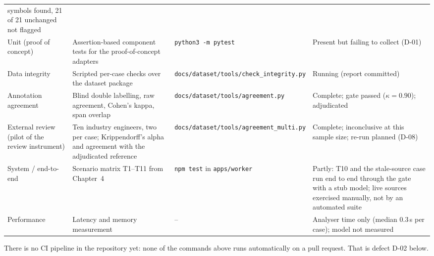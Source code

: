 \begin{longtable}{>{\raggedright\arraybackslash}p{} >{\raggedright\arraybackslash}p{} >{\raggedright\arraybackslash}p{} >{\raggedright\arraybackslash}p{}}
  symbols found, 21 of 21 unchanged not flagged \\
Unit (proof of concept) & Assertion-based component tests for the
  proof-of-concept adapters &
  \texttt{python3 -m pytest} & Present but failing to collect (D-01) \\
Data integrity & Scripted per-case checks over the dataset package &
  \texttt{docs/\allowbreak{}dataset/\allowbreak{}tools/\allowbreak{}check\_\allowbreak{}integrity.\allowbreak{}py} & Running (report committed) \\
Annotation agreement & Blind double labelling, raw agreement, Cohen's kappa,
  span overlap & \texttt{docs/\allowbreak{}dataset/\allowbreak{}tools/\allowbreak{}agreement.\allowbreak{}py} & Complete; gate
  passed ($\kappa = 0.90$); adjudicated \\
External review (pilot of the review instrument) & Ten industry engineers,
  two per case; Krippendorff's alpha and agreement with the adjudicated
  reference &
  \texttt{docs/\allowbreak{}dataset/\allowbreak{}tools/\allowbreak{}agreement\_\allowbreak{}multi.\allowbreak{}py} &
  Complete; inconclusive at this sample size; re-run planned (D-08) \\
System / end-to-end & Scenario matrix T1--T11 from Chapter~4 &
  \texttt{npm test} in \texttt{apps/\allowbreak{}worker} & Partly: T10 and
  the stale-source case run end to end through the gate with a stub model; live
  sources exercised manually, not by an automated suite \\
Performance & Latency and memory measurement & -- & Analyser time only
  (median 0.3\,s per case); model not measured \\
\hline\end{longtable}

There is no CI pipeline in the repository yet: none of the commands above runs
automatically on a pull request. That is defect D-02 below.

